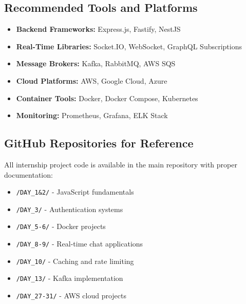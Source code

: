 \subsection{Recommended Tools and Platforms}

\begin{itemize}
    \item \textbf{Backend Frameworks:} Express.js, Fastify, NestJS
    \item \textbf{Real-Time Libraries:} Socket.IO, WebSocket, GraphQL Subscriptions
    \item \textbf{Message Brokers:} Kafka, RabbitMQ, AWS SQS
    \item \textbf{Cloud Platforms:} AWS, Google Cloud, Azure
    \item \textbf{Container Tools:} Docker, Docker Compose, Kubernetes
    \item \textbf{Monitoring:} Prometheus, Grafana, ELK Stack
\end{itemize}

\subsection{GitHub Repositories for Reference}

All internship project code is available in the main repository with proper documentation:

\begin{itemize}
    \item \texttt{/DAY\_1\&2/} - JavaScript fundamentals
    \item \texttt{/DAY\_3/} - Authentication systems
    \item \texttt{/DAY\_5-6/} - Docker projects
    \item \texttt{/DAY\_8-9/} - Real-time chat applications
    \item \texttt{/DAY\_10/} - Caching and rate limiting
    \item \texttt{/DAY\_13/} - Kafka implementation
    \item \texttt{/DAY\_27-31/} - AWS cloud projects
\end{itemize}
